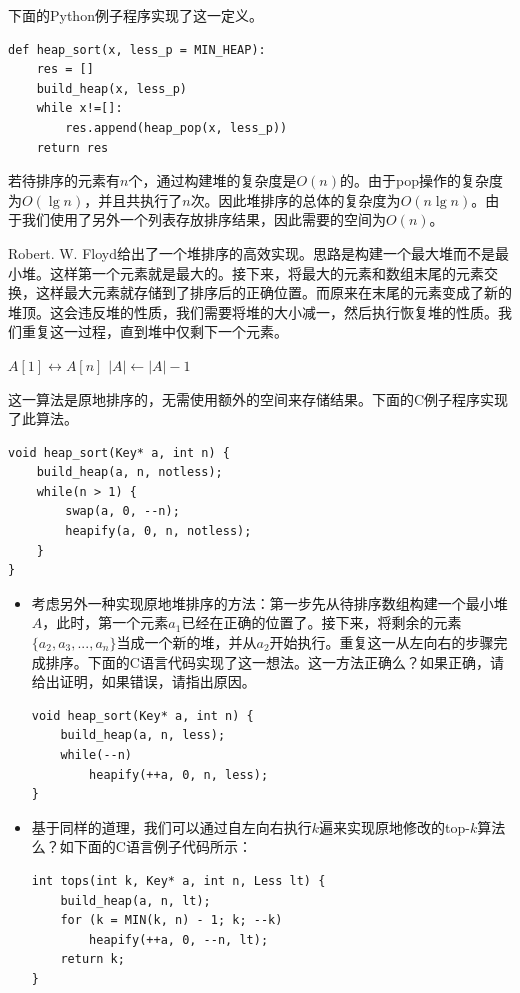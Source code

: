 \documentclass[b5paper]{ctexart}
\begin{document}
下面的Python例子程序实现了这一定义。

\lstset{language=Python}
\begin{lstlisting}
def heap_sort(x, less_p = MIN_HEAP):
    res = []
    build_heap(x, less_p)
    while x!=[]:
        res.append(heap_pop(x, less_p))
    return res
\end{lstlisting}

若待排序的元素有$n$个，通过构建堆的复杂度是$O(n)$的。由于pop操作的复杂度为$O(\lg n)$，并且共执行了$n$次。因此堆排序的总体的复杂度为$O(n \lg n)$。由于我们使用了另外一个列表存放排序结果，因此需要的空间为$O(n)$。

Robert. W. Floyd给出了一个堆排序的高效实现。思路是构建一个最大堆而不是最小堆。这样第一个元素就是最大的。接下来，将最大的元素和数组末尾的元素交换，这样最大元素就存储到了排序后的正确位置。而原来在末尾的元素变成了新的堆顶。这会违反堆的性质，我们需要将堆的大小减一，然后执行恢复堆的性质。我们重复这一过程，直到堆中仅剩下一个元素。

\begin{algorithmic}[1]
  \State {}
    \State {} $A[1] \leftrightarrow A[n]$
    \State $|A| \gets |A| - 1$
    \State {}
  \EndWhile
\EndFunction
\end{algorithmic}

这一算法是原地排序的，无需使用额外的空间来存储结果。下面的C例子程序实现了此算法。

\lstset{language=C}
\begin{lstlisting}
void heap_sort(Key* a, int n) {
    build_heap(a, n, notless);
    while(n > 1) {
        swap(a, 0, --n);
        heapify(a, 0, n, notless);
    }
}
\end{lstlisting}

\begin{Exercise}
\begin{itemize}
\item 考虑另外一种实现原地堆排序的方法：第一步先从待排序数组构建一个最小堆$A$，此时，第一个元素$a_1$已经在正确的位置了。接下来，将剩余的元素$\{a_2, a_3, ..., a_n\}$当成一个新的堆，并从$a_2$开始执行。重复这一从左向右的步骤完成排序。下面的C语言代码实现了这一想法。这一方法正确么？如果正确，请给出证明，如果错误，请指出原因。
\lstset{language=C}
\begin{lstlisting}
void heap_sort(Key* a, int n) {
    build_heap(a, n, less);
    while(--n)
        heapify(++a, 0, n, less);
}
\end{lstlisting}

\item 基于同样的道理，我们可以通过自左向右执行$k$遍来实现原地修改的top-$k$算法么？如下面的C语言例子代码所示：
\lstset{language=C}
\begin{lstlisting}
int tops(int k, Key* a, int n, Less lt) {
    build_heap(a, n, lt);
    for (k = MIN(k, n) - 1; k; --k)
        heapify(++a, 0, --n, lt);
    return k;
}
\end{lstlisting}
\end{itemize}
\end{Exercise}
\end{document}
